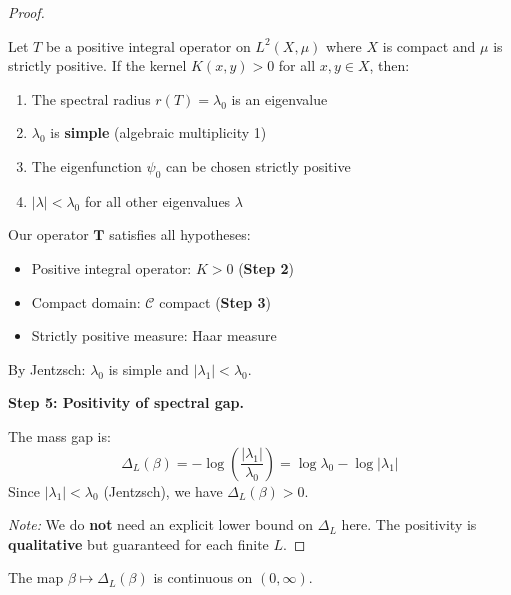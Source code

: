 \begin{proof}
\begin{tcolorbox}[colback=blue!5,colframe=blue!50,title=\textbf{Jentzsch's Theorem (1912)}]
Let $T$ be a positive integral operator on $L^2(X, \mu)$ where $X$ is compact 
and $\mu$ is strictly positive. If the kernel $K(x,y) > 0$ for all $x, y \in X$, 
then:
\begin{enumerate}
\item The spectral radius $r(T) = \lambda_0$ is an eigenvalue
\item $\lambda_0$ is \textbf{simple} (algebraic multiplicity 1)
\item The eigenfunction $\psi_0$ can be chosen strictly positive
\item $|\lambda| < \lambda_0$ for all other eigenvalues $\lambda$
\end{enumerate}
\end{tcolorbox}

Our operator $\mathbf{T}$ satisfies all hypotheses:
\begin{itemize}
\item Positive integral operator: $K > 0$ (\textbf{Step 2})
\item Compact domain: $\mathcal{C}$ compact (\textbf{Step 3})
\item Strictly positive measure: Haar measure
\end{itemize}

By Jentzsch: $\lambda_0$ is simple and $|\lambda_1| < \lambda_0$.

\textbf{Step 5: Positivity of spectral gap.}

The mass gap is:
\[
\Delta_L(\beta) = -\log\left(\frac{|\lambda_1|}{\lambda_0}\right) = \log\lambda_0 - \log|\lambda_1|
\]
Since $|\lambda_1| < \lambda_0$ (Jentzsch), we have $\Delta_L(\beta) > 0$.

\textit{Note:} We do \textbf{not} need an explicit lower bound on $\Delta_L$ here.
The positivity is \textbf{qualitative} but guaranteed for each finite $L$.
\end{proof}

\begin{theorem}
\label{thm:continuity-complete}
The map $\beta \mapsto \Delta_L(\beta)$ is continuous on $(0, \infty)$.
\end{theorem}

